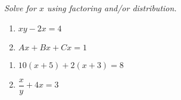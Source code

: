 \documentclass[11pt]{article}
\newcommand{\ds}{\displaystyle}
\begin{document}


\noindent 
\textit{Solve for $x$ using factoring and/or distribution.}
\begin{multicols}{2}
\begin{enumerate}
\setcounter{enumi}{\theenumCount}
\item $xy - 2x = 4$ 
\item $Ax + Bx + Cx = 1$ 
\setcounter{enumCount}{\theenumi}
\end{enumerate}
\end{multicols}
\vfill

\begin{multicols}{2}
\begin{enumerate}
\setcounter{enumi}{\theenumCount}
\item $10(x+5)+2(x+3) = 8$
\item $\dfrac{x}{y} + 4x = 3$ 
\setcounter{enumCount}{\theenumi}
\end{enumerate}
\end{multicols}
\vfill

%
%
%
%
\end{document}
